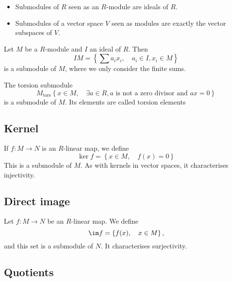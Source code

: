 \begin{ex}
    \begin{itemize}
        \item Submodules of $R$ seen as an $R$-module are ideals of $R$.
        \item Submodules of a vector space $V$ seen as modules are exactly the vector subspaces of $V$.
    \end{itemize}
\end{ex}

\begin{ex}
    Let $M$ be a $R$-module and $I$ an ideal of $R$. Then \[IM =  \left\{ \sum a_ix_i, \quad a_i\in I, x_i\in M \right\} \] is a submodule of $M$, where we only consider the finite sums.
\end{ex}

\begin{ex}
    The torsion submodule \[M_{\mathrm{tors}} \left\{ x \in  M, \quad  \exists  a \in  R, a \text{ is not a zero divisor and } ax=0 \right\} \] is a submodule of $M$. Its elements are called torsion elements
\end{ex}

\subsection{Kernel}

\begin{dfn}
    If $f: M \longrightarrow  N$ is an $R$-linear map, we define \[\ker f = \left\{ x \in  M, \quad  f(x)=0 \right\} \]
    This is a submodule of $M$. As with kernels in vector spaces, it characterises injectivity.
\end{dfn}

\subsection{Direct image}

\begin{dfn}
    Let $f: M \longrightarrow  N$ be an $R$-linear map. We define \[\im f = \left\{ f(x), \quad  x \in  M \right\}, \] and this set is a submodule of $N$. It characterises surjectivity.
\end{dfn}

\subsection{Quotients}

